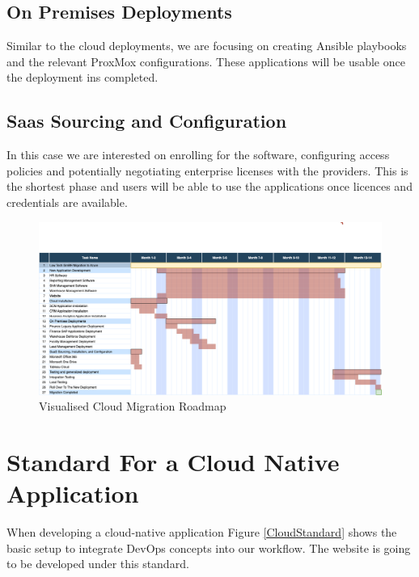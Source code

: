 \documentclass{llncs}
\begin{document}
\subsection{On Premises Deployments}

Similar to the cloud deployments, we are focusing on creating Ansible playbooks and the relevant ProxMox configurations. These applications will be usable once the deployment ins completed.

\subsection{Saas Sourcing and Configuration}

In this case we are interested on enrolling for the software, configuring access policies and potentially negotiating enterprise licenses with the providers. This is the shortest phase and users will be able to use the applications once licences and credentials are available.

\begin{figure}[htbp]
    \begin{center}
        \includegraphics[width=1\textwidth]{diagrams/roadmap.png}
        \vspace{0.01\textwidth}
        \caption{Visualised Cloud Migration Roadmap}
        \label{cloud migration roadmap} %
    \end{center}
\end{figure}


\section{Standard For a Cloud Native Application}

When developing a cloud-native application Figure \ref{CloudStandard} shows the basic setup to integrate DevOps concepts into our workflow.
The website is going to be developed under this standard.\\
\end{document}
